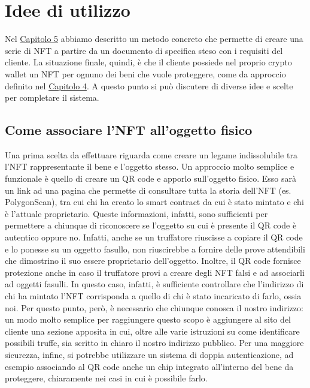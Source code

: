 \documentclass[12pt]{report}
\begin{document}
\chapter{Idee di utilizzo}
\noindent
Nel \hyperref[chap:metodo]{Capitolo 5} abbiamo descritto un metodo concreto che permette di creare una serie di NFT a partire da un documento di specifica steso con i requisiti del cliente. La situazione finale, quindi, è che il cliente possiede nel proprio crypto wallet un NFT per ognuno dei beni che vuole proteggere, come da approccio definito nel \hyperref[chap:capitolo4]{Capitolo 4}.\newline
A questo punto si può discutere di diverse idee e scelte per completare il sistema.

\section{Come associare l'NFT all'oggetto fisico}
\label{sec:idea1}
Una prima scelta da effettuare riguarda come creare un legame indissolubile tra l'NFT rappresentante il bene e l'oggetto stesso.\newline
Un approccio molto semplice e funzionale è quello di creare un QR code e apporlo sull'oggetto fisico. Esso sarà un link ad una pagina che permette di consultare tutta la storia dell'NFT (es. PolygonScan), tra cui chi ha creato lo smart contract da cui è stato mintato e chi è l'attuale proprietario. Queste informazioni, infatti, sono sufficienti per permettere a chiunque di riconoscere se l'oggetto su cui è presente il QR code è autentico oppure no. Infatti, anche se un truffatore riuscisse a copiare il QR code e lo ponesse su un oggetto fasullo, non riuscirebbe a fornire delle prove attendibili che dimostrino il suo essere proprietario dell'oggetto.\newline
Inoltre, il QR code fornisce protezione anche in caso il truffatore provi a creare degli NFT falsi e ad associarli ad oggetti fasulli. In questo caso, infatti, è sufficiente controllare che l'indirizzo di chi ha mintato l'NFT corrisponda a quello di chi è stato incaricato di farlo, ossia noi. Per questo punto, però, è necessario che chiunque conosca il nostro indirizzo: un modo molto semplice per raggiungere questo scopo è aggiungere al sito del cliente una sezione apposita in cui, oltre alle varie istruzioni su come identificare possibili truffe, sia scritto in chiaro il nostro indirizzo pubblico.\newline
Per una maggiore sicurezza, infine, si potrebbe utilizzare un sistema di doppia autenticazione, ad esempio associando al QR code anche un chip integrato all'interno del bene da proteggere, chiaramente nei casi in cui è possibile farlo.
\end{document}
